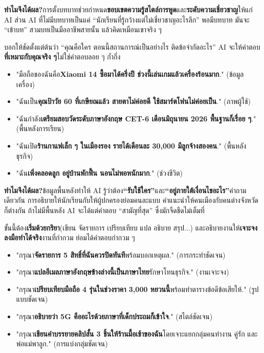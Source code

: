 \textbf{ทำไมจึงได้ผล?}การตั้งบทบาทช่วยกำหนด\textbf{ขอบเขตความรู้}\textbf{สไตล์การพูด}และ\textbf{ระดับความเชี่ยวชาญ}ให้แก่ AI ส่วน AI ที่ไม่มีบทบาทเป็นแค่ “นักเรียนที่รู้กว้างแต่ไม่เชี่ยวชาญอะไรลึก” พอมีบทบาท มันจะ “เข้าบท” สวมบทเป็นมืออาชีพสายนั้น แล้วคิดเหมือนเขาจริง ๆ


บอกให้ชัดตั้งแต่ต้นว่า “คุณคือใคร ตอนนี้สถานการณ์เป็นอย่างไร ติดข้อจำกัดอะไร” AI จะให้คำตอบ\textbf{ที่เหมาะกับคุณจริง ๆ}ไม่ใช่คำตอบลอย ๆ ก้ำกึ่ง


\begin{itemize}
  \item "มือถือของฉันคือ\textbf{Xiaomi 14 ซื้อมาได้ครึ่งปี ช่วงนี้เล่นเกมแล้วเครื่องร้อนมาก}." (ข้อมูลเครื่อง)
  \item "ฉันเป็น\textbf{คุณป้าวัย 60 ที่เกษียณแล้ว สายตาไม่ค่อยดี ใช้สมาร์ตโฟนไม่ค่อยเป็น}." (ภาพผู้ใช้)
  \item "ฉันกำลัง\textbf{เตรียมสอบวัดระดับภาษาอังกฤษ CET-6 เดือนมิถุนายน 2026 พื้นฐานก็เรื่อย ๆ}." (พื้นหลังการเรียน)
  \item "ฉันเปิด\textbf{ร้านกาแฟเล็ก ๆ ในเมืองรอง รายได้เดือนละ 30,000 มีลูกจ้างสองคน}." (พื้นหลังธุรกิจ)
  \item "ฉัน\textbf{เพิ่งคลอดลูก อยู่บ้านพักฟื้น นอนไม่พอหนักมาก}." (ช่วงชีวิต)
\end{itemize}

\textbf{ทำไมจึงได้ผล?}ข้อมูลพื้นหลังทำให้ AI รู้ว่าต้อง\textbf{“รับใช้ใคร”}และ\textbf{“อยู่ภายใต้เงื่อนไขอะไร”}คำถามเดียวกัน การอธิบายให้นักเรียนกับให้ผู้ปกครองย่อมคนละแบบ คำแนะนำให้คนเมืองกับคนต่างจังหวัดก็ต่างกัน ถ้าไม่มีพื้นหลัง AI จะได้แต่คำตอบ “สามัญที่สุด” ซึ่งมักจืดชืดไม่เต็มที่


ขั้นนี้ต้อง\textbf{เริ่มด้วยกริยา}(เขียน จัดรายการ เปรียบเทียบ แปล อธิบาย สรุป...) และอธิบายงานให้\textbf{เจาะจง ลงมือทำได้จริง}งานที่กำกวม ย่อมได้คำตอบกำกวม ๆ


\begin{itemize}
  \item "กรุณา\textbf{จัดรายการ 5 สิทธิ์ที่ฉันควรปิดทันที}พร้อมบอกเหตุผล." (การกระทำชัดเจน)
  \item "กรุณา\textbf{แปลอีเมลภาษาอังกฤษข้างล่างนี้เป็นภาษาไทย}รักษาโทนธุรกิจ." (งานเจาะจง)
  \item "กรุณา\textbf{เปรียบเทียบมือถือ 4 รุ่นในช่วงราคา 3,000 หยวนนี้}พร้อมทำตารางข้อดีข้อเสียให้." (รูปแบบชัดเจน)
  \item "กรุณา\textbf{อธิบายว่า 5G คืออะไรด้วยภาษาที่เด็กประถมก็เข้าใจ}." (สไตล์ชัดเจน)
  \item "กรุณา\textbf{เขียนคำบรรยายคลิปสั้น 3 ชิ้นให้ร้านมื้อเช้าของฉัน}โดยเจาะแยกกลุ่มคนทำงาน คู่รัก และพ่อแม่พาลูก." (การแบ่งกลุ่มชัดเจน)
\end{itemize}

